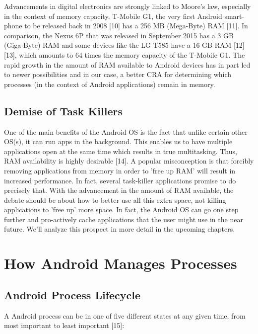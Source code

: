 \documentclass[12pt]{uthesis-v12}  %
\begin{document}
				Advancements in digital electronics are strongly linked to Moore's law, especially in the context of memory capacity. T-Mobile G1, the very first Android smart-phone to be released back in 2008 [10] has a 256 MB (Mega-Byte) RAM [11]. In comparison, the Nexus 6P that was released in September 2015 has a 3 GB (Giga-Byte) RAM and some devices like the LG T585 have a 16 GB RAM [12][13], which amounts to 64 times the memory capacity of the T-Mobile G1. The rapid growth in the amount of RAM available to Android devices has in part led to newer possibilities and in our case, a better CRA for determining which processes (in the context of Android applications) remain in memory.
			 	
		\subsection{Demise of Task Killers}
			One of the main benefits of the Android OS is the fact that unlike certain other OS(s), it can run apps in the background. This enables us to have multiple applications open at the same time which results in true multitasking. Thus, RAM availability is highly desirable [14]. A popular misconception is that forcibly removing applications from memory in order to 'free up RAM' will result in increased performance. In fact, several task-killer applications promise to do precisely that. With the advancement in the amount of RAM available, the debate should be about how to better use all this extra space, not killing applications to 'free up' more space. In fact, the Android OS can go one step further and pro-actively cache applications that the user might use in the near future. We'll analyze this prospect in more detail in the upcoming chapters.  
			
	\section{How Android Manages Processes}
		
		\subsection{Android Process Lifecycle}
			A Android process can be in one of five different states at any given time, from most important to least important [15]:
			
\end{document}
